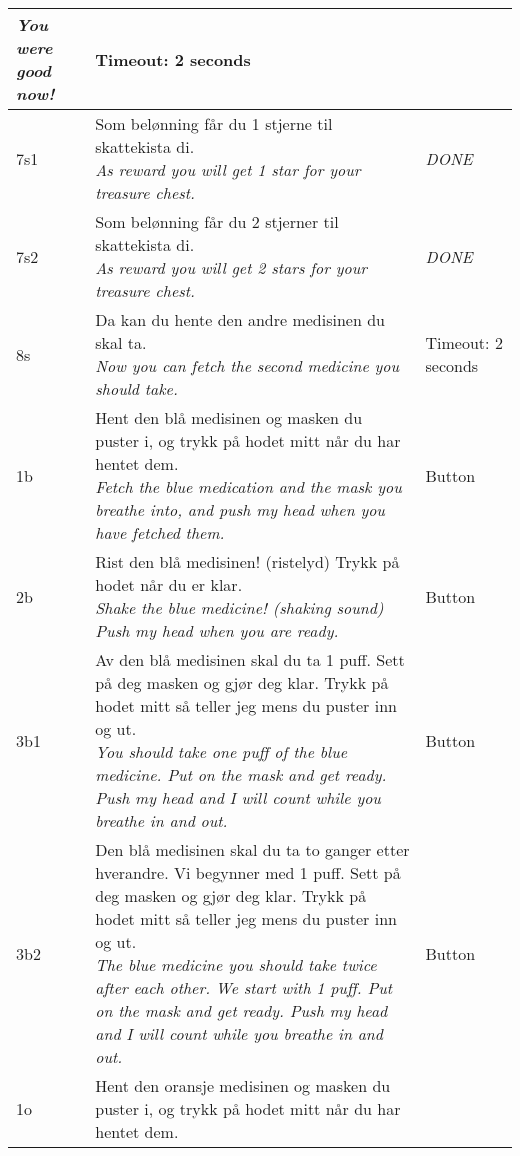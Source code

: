 \begin{center}
\begin{longtable}{|p{1.2cm}|p{13.5cm}|p{2cm}|}
{								\emph{You were good now!}} & Timeout: 2 seconds \\
			\hline
			7s1& \specialcell{13.5cm}{Som bel{\o}nning f{\aa}r du 1 stjerne til skattekista di. \\
								\emph{As reward you will get 1 star for your treasure chest.}} & \emph{DONE} \\
			\hline
			7s2& \specialcell{13.5cm}{Som bel{\o}nning f{\aa}r du 2 stjerner til skattekista di. \\
								\emph{As reward you will get 2 stars for your treasure chest.}} & \emph{DONE} \\
			\hline			
			8s & \specialcell{13.5cm}{Da kan du hente den andre medisinen du skal ta. \\
								\emph{Now you can fetch the second medicine you should take.}} & Timeout: 2 seconds \\
			\hline
			1b & \specialcell{13.5cm}{Hent den bl{\aa} medisinen og masken du puster i, og trykk p{\aa} hodet mitt n{\aa}r du har hentet dem. \\
								\emph{Fetch the blue medication and the mask you breathe into, and push my head when you have fetched them.}} & Button \\
			\hline
			2b & \specialcell{13.5cm}{Rist den bl{\aa} medisinen! (ristelyd) Trykk p{\aa} hodet n{\aa}r du er klar. \\
								\emph{Shake the blue medicine! (shaking sound) Push my head when you are ready.}} & Button \\
			\hline
			3b1& \specialcell{13.5cm}{Av den bl{\aa} medisinen skal du ta 1 puff. Sett p{\aa} deg masken og gj{\o}r deg klar. Trykk p{\aa} hodet mitt s{\aa} teller jeg mens du puster inn og ut. \\
								\emph{You should take one puff of the blue medicine. Put on the mask and get ready. Push my head and I will count while you breathe in and out.}} & Button \\
			\hline
			3b2& \specialcell{13.5cm}{Den bl{\aa} medisinen skal du ta to ganger etter hverandre. Vi begynner med 1 puff. Sett p{\aa} deg masken og gj{\o}r deg klar. Trykk p{\aa} hodet mitt s{\aa} teller jeg mens du puster inn og ut. \\
								\emph{The blue medicine you should take twice after each other. We start with 1 puff. Put on the mask and get ready. Push my head and I will count while you breathe in and out.}} & Button \\
			\hline
			1o & \specialcell{13.5cm}{Hent den oransje medisinen og masken du puster i, og trykk p{\aa} hodet mitt n{\aa}r du har hentet dem. \\
}
\end{longtable}
\end{center}
